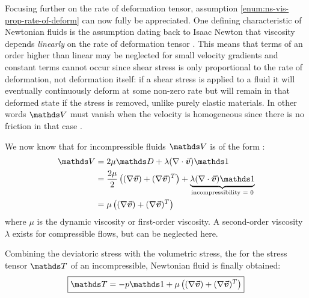 Focusing further on the rate of deformation tensor, assumption \ref{enum:ns-vis-prop-rate-of-deform} can now fully be appreciated. One defining characteristic of Newtonian fluids is the assumption dating back to Isaac Newton that viscosity depends \textit{linearly} on the rate of deformation tensor \autocite*{anderson}. This means that terms of an order higher than linear may be neglected for small velocity gradients\autocite*{incompressible-flow-volker} and constant terms cannot occur since shear stress is only proportional to the rate of deformation, not deformation itself\autocite*{continuum-intro}: if a shear stress is applied to a fluid it will eventually continuously deform at some non-zero rate but will remain in that deformed state if the stress is removed, unlike purely elastic materials\autocite*{continuum-intro}. In other words $\mat{V}$ must vanish when the velocity is homogeneous since there is no friction in that case \autocite*{incompressible-flow-volker}.

We now know that for incompressible fluids $\mat{V}$ is of the form \autocite*{incompressible-flow-volker}:
\begin{align}
    \mat{V} & = 2\mu \mat{D}+ \lambda (\nabla\cdot\vek{v})\mat{1}                                                                                                  \\
            & = \frac{2\mu}{2}\left((\nabla \vek{v}) + (\nabla \vek{v})^T\right) + \underbrace{\lambda (\nabla\cdot\vek{v})\mat{1}}_{\text{incompressibility = 0}} \\
            & = \mu\left((\nabla \vek{v}) + (\nabla \vek{v})^T\right)
\end{align}
where $\mu$ is the dynamic viscosity\autocite*{anderson} or first-order viscosity\autocite*{incompressible-flow-volker}. A second-order viscosity $\lambda$ exists for compressible flows\autocite*{anderson}, but can be neglected here.

Combining the deviatoric stress with the volumetric stress, the  for the stress tensor $\mat{T}$ of an incompressible, Newtonian fluid is finally obtained\autocite*{tutorial}:
\begin{equation}\label{eq:consistutive-relation}
    \text{\fbox{$\mat{T} = -p\mat{1} + \mu\left((\nabla \vek{v}) + (\nabla \vek{v})^T\right)$}}
\end{equation}


